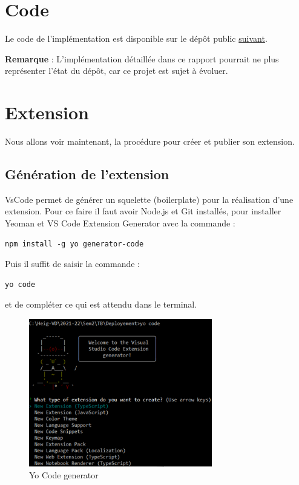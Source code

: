 \documentclass[
    iict, %
    il, %
]{heig-tb}
\begin{document}
\section{Code}
Le code de l'implémentation est disponible sur le dépôt public \href{https://github.com/vitorva/vscode-uon}{suivant}.

\textbf{Remarque} : L'implémentation détaillée dans ce rapport pourrait ne plus représenter l'état du dépôt, car ce projet est sujet à évoluer.

\section{Extension}
Nous allons voir maintenant, la procédure pour créer et publier son extension.

\subsection{Génération de l'extension}
VsCode permet de générer un squelette (boilerplate) pour la réalisation d'une extension. Pour ce faire il faut avoir Node.js et Git installés, pour installer Yeoman et VS Code Extension Generator avec la commande :

\begin{lstlisting}[frame=single,caption={generator-code},label={generator-code}]
npm install -g yo generator-code
\end{lstlisting}

Puis il suffit de saisir la commande :

\begin{lstlisting}[frame=single]
yo code
\end{lstlisting}

et de compléter ce qui est attendu dans le terminal.

\begin{figure}[!h]
    \begin{center}
        \includegraphics[width=8cm]{assets/figures/yo-code.png}
    \end{center}
    \caption[Yo Code generator]{\label{yo-code}Yo Code generator}
\end{figure}
\end{document}
